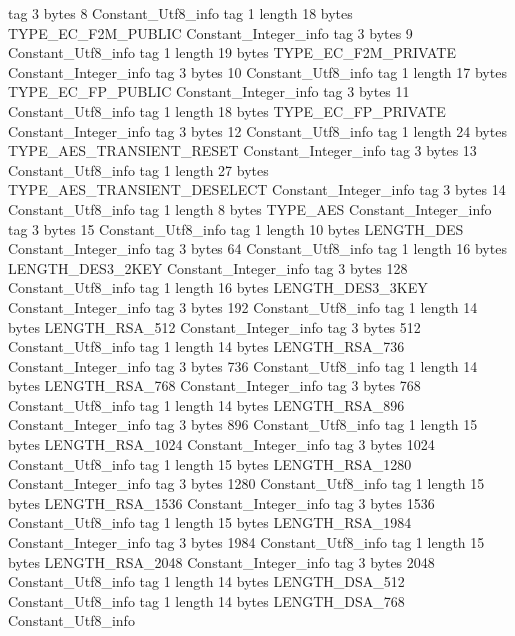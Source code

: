 {{{			tag	3
			bytes	8
		}
		Constant_Utf8_info {
			tag	1
			length	18
			bytes	TYPE_EC_F2M_PUBLIC
		}
		Constant_Integer_info {
			tag	3
			bytes	9
		}
		Constant_Utf8_info {
			tag	1
			length	19
			bytes	TYPE_EC_F2M_PRIVATE
		}
		Constant_Integer_info {
			tag	3
			bytes	10
		}
		Constant_Utf8_info {
			tag	1
			length	17
			bytes	TYPE_EC_FP_PUBLIC
		}
		Constant_Integer_info {
			tag	3
			bytes	11
		}
		Constant_Utf8_info {
			tag	1
			length	18
			bytes	TYPE_EC_FP_PRIVATE
		}
		Constant_Integer_info {
			tag	3
			bytes	12
		}
		Constant_Utf8_info {
			tag	1
			length	24
			bytes	TYPE_AES_TRANSIENT_RESET
		}
		Constant_Integer_info {
			tag	3
			bytes	13
		}
		Constant_Utf8_info {
			tag	1
			length	27
			bytes	TYPE_AES_TRANSIENT_DESELECT
		}
		Constant_Integer_info {
			tag	3
			bytes	14
		}
		Constant_Utf8_info {
			tag	1
			length	8
			bytes	TYPE_AES
		}
		Constant_Integer_info {
			tag	3
			bytes	15
		}
		Constant_Utf8_info {
			tag	1
			length	10
			bytes	LENGTH_DES
		}
		Constant_Integer_info {
			tag	3
			bytes	64
		}
		Constant_Utf8_info {
			tag	1
			length	16
			bytes	LENGTH_DES3_2KEY
		}
		Constant_Integer_info {
			tag	3
			bytes	128
		}
		Constant_Utf8_info {
			tag	1
			length	16
			bytes	LENGTH_DES3_3KEY
		}
		Constant_Integer_info {
			tag	3
			bytes	192
		}
		Constant_Utf8_info {
			tag	1
			length	14
			bytes	LENGTH_RSA_512
		}
		Constant_Integer_info {
			tag	3
			bytes	512
		}
		Constant_Utf8_info {
			tag	1
			length	14
			bytes	LENGTH_RSA_736
		}
		Constant_Integer_info {
			tag	3
			bytes	736
		}
		Constant_Utf8_info {
			tag	1
			length	14
			bytes	LENGTH_RSA_768
		}
		Constant_Integer_info {
			tag	3
			bytes	768
		}
		Constant_Utf8_info {
			tag	1
			length	14
			bytes	LENGTH_RSA_896
		}
		Constant_Integer_info {
			tag	3
			bytes	896
		}
		Constant_Utf8_info {
			tag	1
			length	15
			bytes	LENGTH_RSA_1024
		}
		Constant_Integer_info {
			tag	3
			bytes	1024
		}
		Constant_Utf8_info {
			tag	1
			length	15
			bytes	LENGTH_RSA_1280
		}
		Constant_Integer_info {
			tag	3
			bytes	1280
		}
		Constant_Utf8_info {
			tag	1
			length	15
			bytes	LENGTH_RSA_1536
		}
		Constant_Integer_info {
			tag	3
			bytes	1536
		}
		Constant_Utf8_info {
			tag	1
			length	15
			bytes	LENGTH_RSA_1984
		}
		Constant_Integer_info {
			tag	3
			bytes	1984
		}
		Constant_Utf8_info {
			tag	1
			length	15
			bytes	LENGTH_RSA_2048
		}
		Constant_Integer_info {
			tag	3
			bytes	2048
		}
		Constant_Utf8_info {
			tag	1
			length	14
			bytes	LENGTH_DSA_512
		}
		Constant_Utf8_info {
			tag	1
			length	14
			bytes	LENGTH_DSA_768
		}
		Constant_Utf8_info {
}}}
